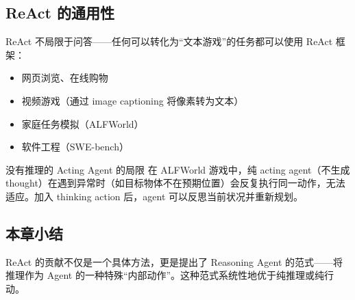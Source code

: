 \subsection{ReAct 的通用性}

ReAct 不局限于问答——任何可以转化为``文本游戏''的任务都可以使用 ReAct 框架：

\begin{itemize}
    \item 网页浏览、在线购物
    \item 视频游戏（通过 image captioning 将像素转为文本）
    \item 家庭任务模拟（ALFWorld）
    \item 软件工程（SWE-bench）
\end{itemize}

\begin{warningbox}{没有推理的 Acting Agent 的局限}
在 ALFWorld 游戏中，纯 acting agent（不生成 thought）在遇到异常时（如目标物体不在预期位置）会反复执行同一动作，无法适应。加入 thinking action 后，agent 可以反思当前状况并重新规划。
\end{warningbox}

\subsection{本章小结}

ReAct 的贡献不仅是一个具体方法，更是提出了 Reasoning Agent 的范式——将推理作为 Agent 的一种特殊``内部动作''。这种范式系统性地优于纯推理或纯行动。

